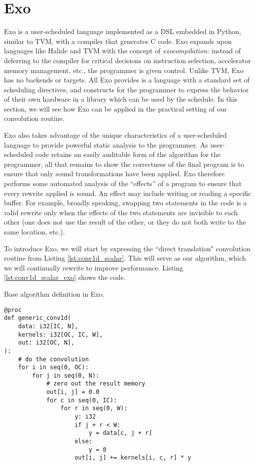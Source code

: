 \documentclass[acmsmall, nonacm=true]{acmart}
\begin{document}
\section{Exo}

Exo \cite{exo} is a user-scheduled language implemented as a DSL embedded in Python, similar to TVM, with a compiler that generates C code. Exo expands upon languages like Halide and TVM with the concept of \textit{exocompilation}: instead of deferring to the compiler for critical decisions on instruction selection, accelerator memory management, etc., the programmer is given control.  Unlike TVM, Exo has no backends or targets. All Exo provides is a language with a standard set of scheduling directives, and constructs for the programmer to express the behavior of their own hardware in a library which can be used by the schedule. In this section, we will see how Exo can be applied in the practical setting of our convolution routine.

Exo also takes advantage of the unique characteristics of a user-scheduled language to provide powerful static analysis to the programmer. As user-scheduled code retains an easily auditable form of the algorithm for the programmer, all that remains to show the correctness of the final program is to ensure that only sound transformations have been applied. Exo therefore performs some automated analysis of the ``effects'' of a program to ensure that every rewrite applied is sound. An effect may include writing or reading a specific buffer. For example, broadly speaking, swapping two statements in the code is a valid rewrite only when the effects of the two statements are invisible to each other (one does not use the result of the other, or they do not both write to the same location, etc.).

To introduce Exo, we will start by expressing the ``direct translation" convolution routine from Listing \ref{lst:conv1d_scalar}. This will serve as our algorithm, which we will continually rewrite to improve performance. Listing \ref{lst:conv1d_scalar_exo} shows the code. 

\begin{listing}
\centering
\caption{Base algorithm definition in Exo.}
\begin{verbatim}
@proc
def generic_conv1d(
    data: i32[IC, N],
    kernels: i32[OC, IC, W],
    out: i32[OC, N],
):
    # do the convolution
    for i in seq(0, OC):
        for j in seq(0, N):
            # zero out the result memory
            out[i, j] = 0.0
            for c in seq(0, IC):
                for r in seq(0, W):
                    y: i32
                    if j + r < W:
                        y = data[c, j + r]
                    else:
                        y = 0
                    out[i, j] += kernels[i, c, r] * y
\end{verbatim}
\label{lst:conv1d_scalar_exo}
\end{listing}
\end{document}
